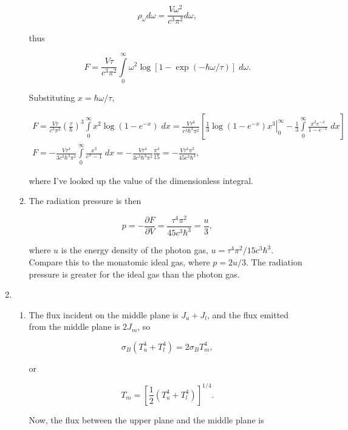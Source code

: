 \documentclass{article}
\begin{document}
\begin{enumerate}
\begin{enumerate}
		$$\rho_\omega d\omega = \frac{V \omega^2}{c^3 \pi^2} d\omega,$$

		thus

		$$F = \frac{V \tau}{c^3 \pi^2} \int \limits_0^\infty \omega^2 \log \left[ 1 - \exp \left( - \hbar \omega / \tau \right) \right] \; d\omega.$$

		Substituting $x = \hbar \omega / \tau$, 

		\begin{gather*}
		F = \frac{V \tau}{c^3 \pi^2} \left( \frac{\tau}{\hbar} \right)^3 \int \limits_0^\infty x^2 \log (1 - e^{-x}) \; dx = \frac{ V \tau^4}{ c^3 \hbar^3 \pi^2} \left[ \left. \frac{1}{3}\log(1 - e^{-x} )  x^3 \right\rvert_0^\infty - \frac{1}{3} \int\limits_0^\infty \frac{x^3 e^{-x}}{1 - e^{-x}} \; dx \right] \\
		F = - \frac{ V \tau^4}{3  c^3 \hbar^3 \pi^2} \int\limits_0^\infty \frac{x^3}{e^{x} - 1} \; dx = - \frac{ V \tau^4}{3  c^3 \hbar^3 \pi^2}  \frac{\pi^4}{15} = - \frac{ V \tau^4 \pi^2}{45  c^3 \hbar^3},
		\end{gather*}

		where I've looked up the value of the dimensionless integral.

		\item

		The radiation pressure is then

		$$p = - \frac{\partial F}{\partial V} = \frac{ \tau^4 \pi^2}{45  c^3 \hbar^3} = \frac{u}{3},$$

		where $u$ is the energy density of the photon gas, $u = \tau^4 \pi^2 / 15  c^3 \hbar^3$. Compare this to the monatomic ideal gas, where $p = 2u/3$. The radiation pressure is greater for the ideal gas than the photon gas.

	\end{enumerate}

	\item

	\begin{enumerate}

		\item

		The flux incident on the middle plane is $J_u + J_l$, and the flux emitted from the middle plane is $2J_m$, so 

		$$\sigma_B(T_u^4 + T_l^4) = 2 \sigma_B T_m^4,$$

		or 

		$$T_m = \left[ \frac{1}{2}(T_u^4 + T_l^4) \right]^{1/4}.$$

		Now, the flux between the upper plane and the middle plane is


\end{enumerate}
\end{enumerate}
\end{document}
